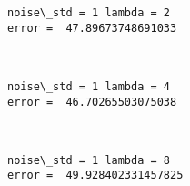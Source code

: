 \documentclass[11pt]{article}
\begin{document}
    \begin{Verbatim}[commandchars=\\\{\}]
noise\_std = 1 lambda = 2
error =  47.89673748691033

    \end{Verbatim}

    \begin{center}
    \end{center}
    { \hspace*{\fill} \\}
    
    \begin{Verbatim}[commandchars=\\\{\}]
noise\_std = 1 lambda = 4
error =  46.70265503075038

    \end{Verbatim}

    \begin{center}
    \end{center}
    { \hspace*{\fill} \\}
    
    \begin{Verbatim}[commandchars=\\\{\}]
noise\_std = 1 lambda = 8
error =  49.928402331457825

    \end{Verbatim}

    \begin{center}
    \end{center}
    { \hspace*{\fill} \\}
    

    
    
    
    
\end{document}
